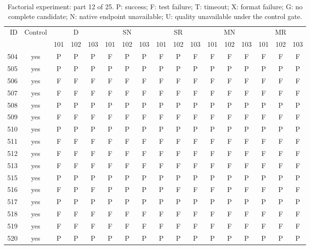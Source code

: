\begin{table}[p]\centering\footnotesize
\setlength{\tabcolsep}{3pt}
\caption{Factorial experiment: part 12 of 25. P: success; F: test failure; T: timeout; X: format failure; G: no complete candidate; N: native endpoint unavailable; U: quality unavailable under the control gate.}
\begin{tabular*}{\textwidth}{@{\extracolsep{\fill}}rcccccccccccccccc}\toprule
ID & Control & \multicolumn{3}{c}{D} & \multicolumn{3}{c}{SN} & \multicolumn{3}{c}{SR} & \multicolumn{3}{c}{MN} & \multicolumn{3}{c}{MR}\\
\cmidrule(lr){3-5}\cmidrule(lr){6-8}\cmidrule(lr){9-11}\cmidrule(lr){12-14}\cmidrule(lr){15-17}
 & & 101 & 102 & 103 & 101 & 102 & 103 & 101 & 102 & 103 & 101 & 102 & 103 & 101 & 102 & 103\\\midrule
504 & yes & P & P & P & F & P & P & F & P & F & F & F & F & F & F & F\\
505 & yes & P & P & P & P & P & P & P & P & P & P & P & P & P & P & P\\
506 & yes & F & F & F & F & F & F & F & F & F & F & F & F & F & F & F\\
507 & yes & F & F & F & F & F & F & F & F & F & F & F & F & F & F & F\\
508 & yes & P & P & P & P & P & P & P & P & P & P & P & P & P & P & P\\
509 & yes & F & F & F & F & F & F & F & F & F & F & F & F & F & F & F\\
510 & yes & P & P & P & P & P & P & P & P & P & P & P & P & P & P & P\\
511 & yes & F & F & F & F & F & F & F & F & F & F & F & F & F & F & F\\
512 & yes & F & F & F & F & F & F & F & F & F & F & F & F & F & F & F\\
513 & yes & F & F & F & F & F & F & F & F & F & F & F & F & F & F & F\\
515 & yes & P & P & P & P & P & P & P & P & P & P & P & P & P & P & P\\
516 & yes & F & P & F & P & P & P & P & F & F & F & P & F & F & P & F\\
517 & yes & P & P & P & P & P & P & P & P & P & P & P & P & P & P & P\\
518 & yes & F & F & F & F & F & F & F & F & F & F & F & F & F & F & F\\
519 & yes & F & F & F & F & F & F & F & F & F & F & F & F & F & F & F\\
520 & yes & P & P & P & P & P & P & P & P & P & P & P & P & P & P & P\\

\end{tabular*}
\end{table}
